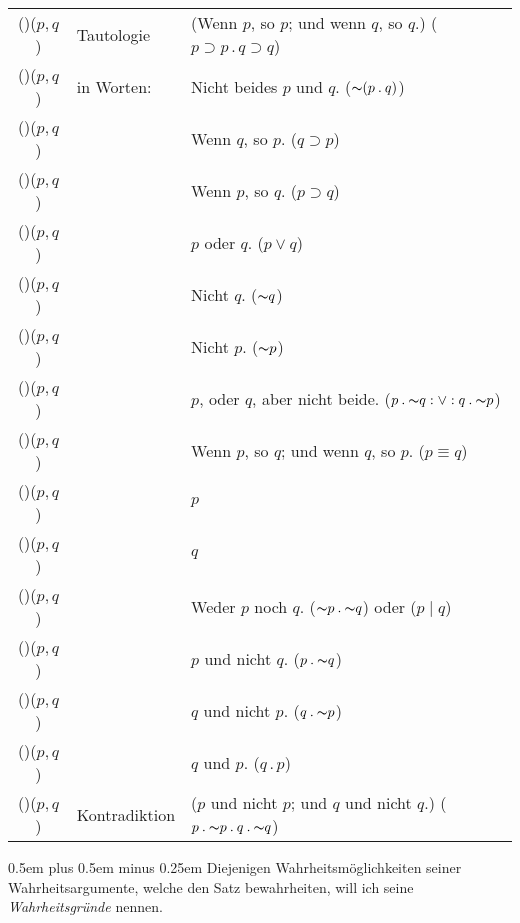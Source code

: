\documentclass[12pt,oneside]{book}[2007/10/19]
\newcommand{\Not}[1]{\mathord{\thicksim} #1}
\newcommand{\DotOp}{\mathbin{.}}
\newcommand{\BarOp}{\mathbin{|}}
\newcommand{\Implies}{\supset}
\newcommand{\Emph}[1]{\emph{#1}}%
\newcommand{\ditto}{\quotedblbase}
\newlength{\DittoLen}
\newcommand{\DittoInWorten}{%
 \settowidth{\DittoLen}{in}%
 \makebox[\DittoLen]{\ditto}~%
 \settowidth{\DittoLen}{Worten:}%
 \makebox[\DittoLen]{\ditto}}
\newlength{\WLen}     %
\newcommand{\False}{\makebox[\WLen]{F}} %
\newcommand{\Wahr}{\makebox[\WLen]{W}}  %
\newcommand{\verystretchyspace}{\spaceskip0.5em plus 0.5em minus 0.25em}
\begin{document}
\begin{propositions}
{\begin{table*}[!h]
\footnotesize\noindent\centering
\begin{tabular}{@{}c@{~}l@{~}l@{}}
(\Wahr\Wahr\Wahr\Wahr)($p, q$) & Tautologie & (Wenn $p$, so $p$; und wenn $q$, so $q$.) ($p \Implies p \DotOp q \Implies q$)\\
(\False\Wahr\Wahr\Wahr)($p, q$) & in Worten: & Nicht beides $p$ und $q$. ($\Not{(p \DotOp q)}$)\\
(\Wahr\False\Wahr\Wahr)($p, q$) & \DittoInWorten & Wenn $q$, so $p$. ($q \Implies p$)\\
(\Wahr\Wahr\False\Wahr)($p, q$) & \DittoInWorten & Wenn $p$, so $q$. ($p \Implies q$)\\
(\Wahr\Wahr\Wahr\False)($p, q$) & \DittoInWorten & $p$ oder $q$. ($p \lor q$)\\
(\False\False\Wahr\Wahr)($p, q$) & \DittoInWorten & Nicht $q$. ($\Not{q}$)\\
(\False\Wahr\False\Wahr)($p, q$) & \DittoInWorten & Nicht $p$. ($\Not{p}$)\\
(\False\Wahr\Wahr\False)($p, q$) & \DittoInWorten & $p$, oder $q$, aber nicht beide. ($p \DotOp \Not{q} : \lor : q \DotOp \Not{p}$)\\
(\Wahr\False\False\Wahr)($p, q$) & \DittoInWorten & Wenn $p$, so $q$; und wenn $q$, so $p$. ($p \equiv q$)\\
(\Wahr\False\Wahr\False)($p, q$) & \DittoInWorten & $p$\\
(\Wahr\Wahr\False\False)($p, q$) & \DittoInWorten & $q$\\
(\False\False\False\Wahr)($p, q$) & \DittoInWorten & Weder $p$ noch $q$. ($\Not{p} \DotOp \Not{q}$) oder ($p \BarOp q$)\\
(\False\False\Wahr\False)($p, q$) & \DittoInWorten & $p$ und nicht $q$. ($p \DotOp \Not{q}$)\\
(\False\Wahr\False\False)($p, q$) & \DittoInWorten & $q$ und nicht $p$. ($q \DotOp \Not{p}$)\\
(\Wahr\False\False\False)($p, q$) & \DittoInWorten & $q$ und $p$. ($q \DotOp p$)\\
(\False\False\False\False)($p, q$) & Kontradiktion & ($p$ und nicht $p$; und $q$ und nicht $q$.) ($p \DotOp \Not{p} \DotOp q \DotOp \Not{q}$)\\
\end{tabular}
\end{table*}

{\verystretchyspace
Diejenigen Wahrheitsmöglichkeiten seiner
Wahrheitsargumente, welche den Satz bewahrheiten,
will ich seine \Emph{Wahrheitsgründe}
nennen.}}



\end{propositions}
\end{document}
